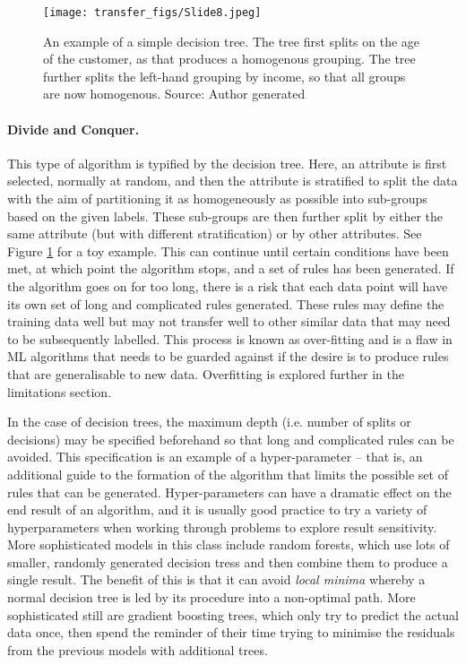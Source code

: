 \begin{figure}
  \texttt{[image: transfer\_figs/Slide8.jpeg]}
  \caption[Decision tree example.]{An example of a simple decision tree. The tree first splits on the age of the customer, as that produces a homogenous grouping. The tree further splits the left-hand grouping by income, so that all groups are now homogenous.  Source: Author generated }
  \label{fig:tree}
\end{figure}

\paragraph{Divide and Conquer.} This type of algorithm is typified by the decision tree. Here, an attribute is first selected, normally at random, and then the attribute is stratified to split the data with the aim of partitioning it as homogeneously as possible into sub-groups based on the given labels. These sub-groups are then further split by either the same attribute (but with different stratification) or by other attributes. See Figure \ref{fig:tree} for a toy example. This can continue until certain conditions have been met, at which point the algorithm stops, and a set of rules has been generated. If the algorithm goes on for too long, there is a risk that each data point will have its own set of long and complicated rules generated. These rules may define the training data well but may not transfer well to other similar data that may need to be subsequently labelled. This process is known as over-fitting and is a flaw in ML algorithms that needs to be guarded against if the desire is to produce rules that are generalisable to new data. Overfitting is explored further in the limitations section.

In the case of decision trees, the maximum depth (i.e. number of splits or decisions) may be specified beforehand so that long and complicated rules can be avoided. This specification is an example of a hyper-parameter – that is, an additional guide to the formation of the algorithm that limits the possible set of rules that can be generated. Hyper-parameters can have a dramatic effect on the end result of an algorithm, and it is usually good practice to try a variety of hyperparameters when working through problems to explore result sensitivity. More sophisticated models in this class include random forests, which use lots of smaller, randomly generated decision tress and then combine them to produce a single result. The benefit of this is that it can avoid  \emph{local minima} whereby a normal decision tree is led by its procedure into a non-optimal path. More sophisticated still are gradient boosting trees, which only try to predict the actual data once, then spend the reminder of their time trying to minimise the residuals from the previous models with additional trees.



